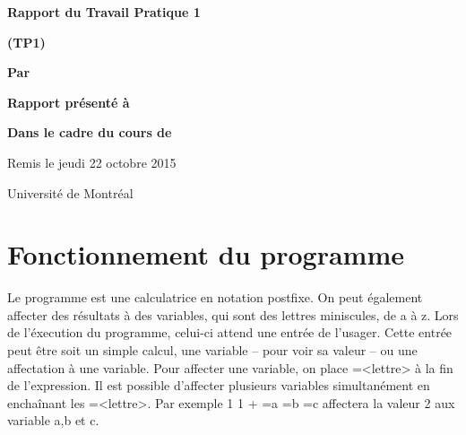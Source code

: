 \documentclass[letterpaper,12pt]{scrartcl}
\begin{document}
	\begin{center}
		\vspace{2cm}

		{\Huge\bf\sf Rapport du Travail Pratique 1}

		\vspace{0.5cm}

		{\bf\sf (TP1)}

		\vspace{4cm}

		{\bf\sf Par}

		\vspace{0.5cm}{\large\bf\sf Sulliman Aïad et François Poitras}

		\vspace{2cm}

		{\bf\sf Rapport présenté à}

		\vspace{0.5cm}{\large\bf\sf M. Marc  Feeley}

		\vspace{2cm}

		{\bf\sf Dans le cadre du cours de}

		\vspace{0.5cm}{\large\bf\sf Concepts des langages de programmation (IFT2035)}

		\vspace{\fill}
		Remis le jeudi 22 octobre 2015

		\vspace{0.5cm}Université de Montréal
	\end{center}
	
	\newpage

	\pagestyle{cb}
	
	\tableofcontents

	\newpage
	
	\section{Fonctionnement du programme}
		Le programme est une calculatrice en notation postfixe. On peut également affecter des résultats à des variables, qui sont des lettres miniscules, de a à z. Lors de l'éxecution du programme, celui-ci attend une entrée de l'usager. Cette entrée peut être soit un simple calcul, une variable -- pour voir sa valeur -- ou une affectation à une variable. Pour affecter une variable, on place =<lettre> à la fin de l'expression. Il est possible d'affecter plusieurs variables simultanément en enchaînant les =<lettre>. Par exemple 1 1 + =a =b =c affectera la valeur 2 aux variable a,b et c.
			
\end{document}
